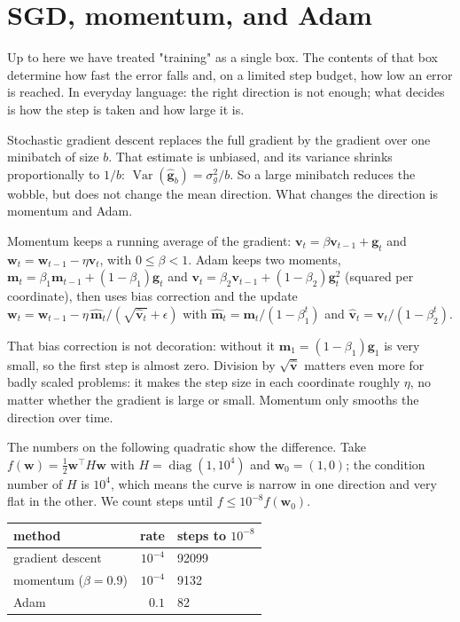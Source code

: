 \section{SGD, momentum, and Adam}

Up to here we have treated "training" as a single box. The contents of that box
determine how fast the error falls and, on a limited step budget, how low an error is
reached. In everyday language: the right direction is not enough; what decides is how
the step is taken and how large it is.

Stochastic gradient descent replaces the full gradient by the gradient over one
minibatch of size $b$. That estimate is unbiased, and its variance shrinks
proportionally to $1/b$: $\operatorname{Var}(\hat{\mathbf{g}}_b)=\sigma_g^2/b$. So a
large minibatch reduces the wobble, but does not change the mean direction. What
changes the direction is momentum and Adam.

\begin{definisi}
Momentum keeps a running average of the gradient:
$\mathbf{v}_t=\beta\mathbf{v}_{t-1}+\mathbf{g}_t$ and
$\mathbf{w}_t=\mathbf{w}_{t-1}-\eta\mathbf{v}_t$, with $0\le\beta<1$. Adam keeps two
moments, $\mathbf{m}_t=\beta_1\mathbf{m}_{t-1}+(1-\beta_1)\mathbf{g}_t$ and
$\mathbf{v}_t=\beta_2\mathbf{v}_{t-1}+(1-\beta_2)\mathbf{g}_t^2$ (squared per
coordinate), then uses bias correction and the update
$\mathbf{w}_t=\mathbf{w}_{t-1}-\eta\,\hat{\mathbf{m}}_t/(\sqrt{\hat{\mathbf{v}}_t}+\epsilon)$
with $\hat{\mathbf{m}}_t=\mathbf{m}_t/(1-\beta_1^t)$ and
$\hat{\mathbf{v}}_t=\mathbf{v}_t/(1-\beta_2^t)$.
\end{definisi}

That bias correction is not decoration: without it $\mathbf{m}_1=(1-\beta_1)\mathbf{g}_1$
is very small, so the first step is almost zero. Division by $\sqrt{\hat{\mathbf{v}}}$
matters even more for badly scaled problems: it makes the step size in each
coordinate roughly $\eta$, no matter whether the gradient is large or small. Momentum
only smooths the direction over time.

The numbers on the following quadratic show the difference. Take
$f(\mathbf{w})=\frac12\mathbf{w}^{\top}H\mathbf{w}$ with $H=\operatorname{diag}(1,10^4)$
and $\mathbf{w}_0=(1,0)$; the condition number of $H$ is $10^4$, which means the curve
is narrow in one direction and very flat in the other. We count steps until
$f\le10^{-8}f(\mathbf{w}_0)$.

\begin{center}
\small
\begin{tabular}{lrl}
\hline
method & rate & steps to $10^{-8}$ \\
\hline
gradient descent & $10^{-4}$ & 92099 \\
momentum ($\beta=0.9$) & $10^{-4}$ & 9132 \\
Adam & $0.1$ & 82 \\
\hline
\end{tabular}
\end{center}

